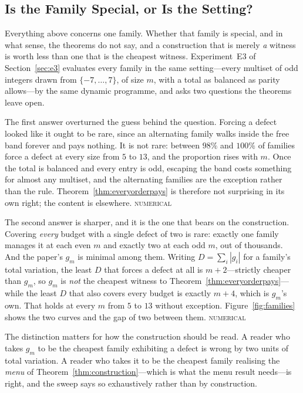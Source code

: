 \documentclass[conference]{IEEEtran}
\theoremstyle{definition}
\newcommand{\NUM}{\textsc{numerical}}
\begin{document}
\subsection{Is the Family Special, or Is the Setting?}
\label{sec:families}

Everything above concerns one family. Whether that family is special, and in what
sense, the theorems do not say, and a construction that is merely \emph{a} witness
is worth less than one that is the cheapest witness. Experiment~E3 of
Section~\ref{sec:e3} evaluates every family in the same setting---every multiset of
odd integers drawn from $\{-7,\dots,7\}$, of size $m$, with a total as balanced as
parity allows---by the same dynamic programme, and asks two questions the
theorems leave open.

The first answer overturned the guess behind the question. Forcing a defect looked
like it ought to be rare, since an alternating family walks inside the free band
forever and pays nothing. It is not rare: between $98\%$ and $100\%$ of families
force a defect at every size from $5$ to $13$, and the proportion rises with $m$.
Once the total is balanced and every entry is odd, escaping the band costs
something for almost any multiset, and the alternating families are the exception
rather than the rule. Theorem~\ref{thm:everyorderpays} is therefore not surprising
in its own right; the content is elsewhere. \NUM{}

The second answer is sharper, and it is the one that bears on the construction.
Covering \emph{every} budget with a single defect of two is rare: exactly one
family manages it at each even $m$ and exactly two at each odd $m$, out of
thousands. And the paper's $g_{m}$ is minimal among them. Writing
$D=\sum_{i}|g_{i}|$ for a family's total variation, the least $D$ that forces a
defect at all is $m+2$---strictly cheaper than $g_{m}$, so $g_{m}$ is \emph{not}
the cheapest witness to Theorem~\ref{thm:everyorderpays}---while the least $D$
that also covers every budget is exactly $m+4$, which is $g_{m}$'s own. That holds
at every $m$ from $5$ to $13$ without exception. Figure~\ref{fig:families} shows
the two curves and the gap of two between them. \NUM{}

The distinction matters for how the construction should be read. A reader who
takes $g_{m}$ to be the cheapest family exhibiting a defect is wrong by two units
of total variation. A reader who takes it to be the cheapest family realising the
\emph{menu} of Theorem~\ref{thm:construction}---which is what the menu result
needs---is right, and the sweep says so exhaustively rather than by construction.
\end{document}
